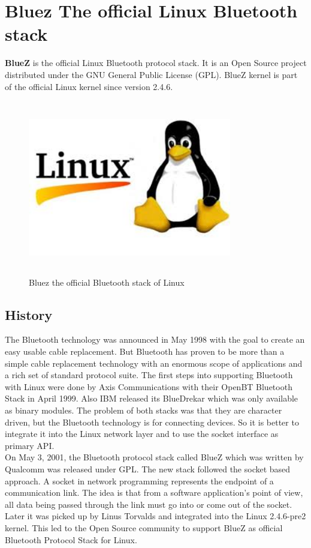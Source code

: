 \section{Bluez The official Linux Bluetooth stack}
\textbf{BlueZ} is the official Linux Bluetooth protocol stack. It is an Open Source project distributed under the GNU General Public License (GPL). BlueZ kernel is part of the official Linux kernel since version 2.4.6.
\begin{figure}[ht]
	\centering
	\includegraphics[width=3.5in, height=3in]{images/bluez_intro.png}
	\caption{Bluez the official Bluetooth stack of Linux}
\end{figure}
\subsection{History}
The Bluetooth technology was announced in May 1998 with the goal to create an easy usable cable replacement. But Bluetooth has proven to be more than a simple cable replacement technology with an enormous scope of applications and a rich set of standard protocol suite. The first steps into supporting Bluetooth with Linux were done by Axis Communications with their OpenBT Bluetooth Stack in April 1999. Also IBM released its BlueDrekar which was only available as binary modules. The problem of both stacks was that they are character driven, but the Bluetooth technology is for connecting devices. So it is better to integrate it into the Linux network layer and to use the socket interface as primary API.\\
On May 3, 2001, the Bluetooth protocol stack called BlueZ which was written by Qualcomm was released under GPL. The new stack followed the socket based approach. A socket in network programming represents the endpoint of a communication link. The idea is that from a software application's point of view, all data being passed through the link must go into or come out of the socket. Later it was picked up by Linus Torvalds and integrated into the Linux 2.4.6-pre2 kernel. This led to the Open Source community to support BlueZ as official Bluetooth Protocol Stack for Linux.
